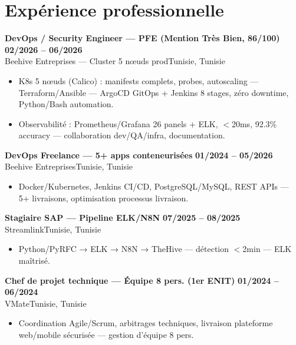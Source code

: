 \documentclass[a4paper,10pt]{article}
\newcommand{\cventry}[4]{\textbf{#1} \hfill \textbf{#4}\\[1pt]#2{\ifx\relax#3\relax\else, #3\fi}\par\vspace{2pt}}
\begin{document}
\section{Expérience professionnelle}
\cventry{DevOps / Security Engineer — PFE (Mention Très Bien, 86/100)}{Beehive Entreprises — Cluster 5 nœuds prod}{Tunisie}{02/2026 -- 06/2026}
\begin{itemize}
  \item K8s 5 nœuds (Calico) : manifests complets, probes, autoscaling — Terraform/Ansible — ArgoCD GitOps + Jenkins 8 stages, zéro downtime, Python/Bash automation.
  \item Observabilité : Prometheus/Grafana 26 panels + ELK, $<$20ms, 92.3\% accuracy — collaboration dev/QA/infra, documentation.
\end{itemize}
\cventry{DevOps Freelance — 5+ apps conteneurisées}{Beehive Entreprises}{Tunisie}{01/2024 -- 05/2026}
\begin{itemize}
  \item Docker/Kubernetes, Jenkins CI/CD, PostgreSQL/MySQL, REST APIs — 5+ livraisons, optimisation processus livraison.
\end{itemize}
\cventry{Stagiaire SAP — Pipeline ELK/N8N}{Streamlink}{Tunisie}{07/2025 -- 08/2025}
\begin{itemize}
  \item Python/PyRFC → ELK → N8N → TheHive — détection $<$2min — ELK maîtrisé.
\end{itemize}
\cventry{Chef de projet technique — Équipe 8 pers. (1er ENIT)}{VMate}{Tunisie}{01/2024 -- 06/2024}
\begin{itemize}
  \item Coordination Agile/Scrum, arbitrages techniques, livraison plateforme web/mobile sécurisée — gestion d'équipe 8 pers.
\end{itemize}
\end{document}

